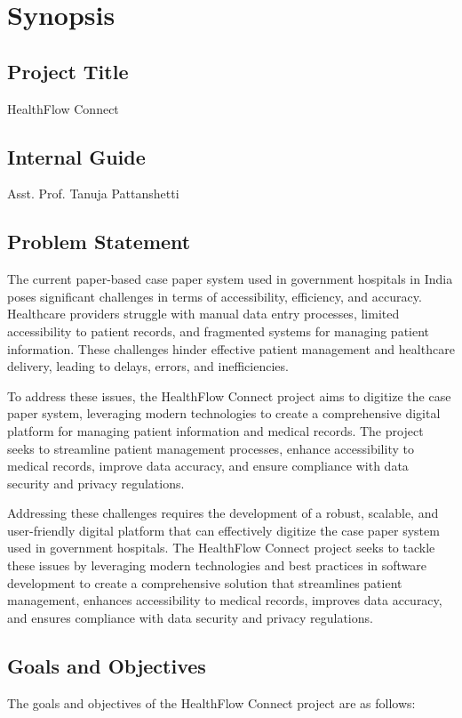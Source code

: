 \chapter{Synopsis}
\section{Project Title}
HealthFlow Connect
\section{Internal Guide}
Asst. Prof. Tanuja Pattanshetti 
\section{Problem Statement}
The current paper-based case paper system used in government hospitals in India poses significant challenges in terms of accessibility, efficiency, and accuracy. Healthcare providers struggle with manual data entry processes, limited accessibility to patient records, and fragmented systems for managing patient information. These challenges hinder effective patient management and healthcare delivery, leading to delays, errors, and inefficiencies.

To address these issues, the HealthFlow Connect project aims to digitize the case paper system, leveraging modern technologies to create a comprehensive digital platform for managing patient information and medical records. The project seeks to streamline patient management processes, enhance accessibility to medical records, improve data accuracy, and ensure compliance with data security and privacy regulations.


Addressing these challenges requires the development of a robust, scalable, and user-friendly digital platform that can effectively digitize the case paper system used in government hospitals. The HealthFlow Connect project seeks to tackle these issues by leveraging modern technologies and best practices in software development to create a comprehensive solution that streamlines patient management, enhances accessibility to medical records, improves data accuracy, and ensures compliance with data security and privacy regulations.

\section{Goals and Objectives}

The goals and objectives of the HealthFlow Connect project are as follows:

